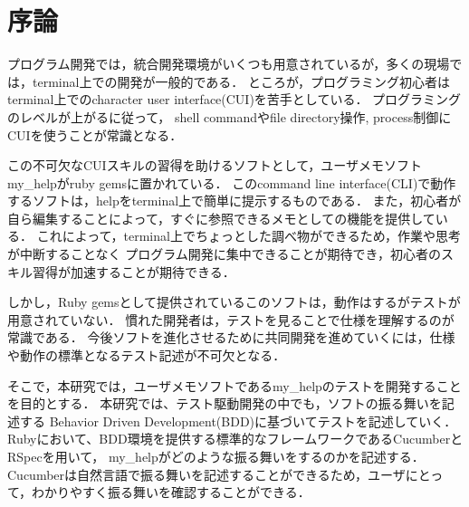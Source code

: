 \section{序論}
プログラム開発では，統合開発環境がいくつも用意されているが，多くの現場では，terminal上での開発が一般的である．
ところが，プログラミング初心者はterminal上でのcharacter user interface(CUI)を苦手としている．
プログラミングのレベルが上がるに従って，
shell commandやfile directory操作, process制御にCUIを使うことが常識となる．

この不可欠なCUIスキルの習得を助けるソフトとして，ユーザメモソフトmy\_helpがruby gemsに置かれている．
このcommand line interface(CLI)で動作するソフトは，helpをterminal上で簡単に提示するものである．
また，初心者が自ら編集することによって，すぐに参照できるメモとしての機能を提供している．
これによって，terminal上でちょっとした調べ物ができるため，作業や思考が中断することなく
プログラム開発に集中できることが期待でき，初心者のスキル習得が加速することが期待できる．

しかし，Ruby gemsとして提供されているこのソフトは，動作はするがテストが用意されていない．
慣れた開発者は，テストを見ることで仕様を理解するのが常識である．
今後ソフトを進化させるために共同開発を進めていくには，仕様や動作の標準となるテスト記述が不可欠となる．

そこで，本研究では，ユーザメモソフトであるmy\_helpのテストを開発することを目的とする．
本研究では、テスト駆動開発の中でも，ソフトの振る舞いを記述する
Behavior Driven Development(BDD)に基づいてテストを記述していく．
Rubyにおいて、BDD環境を提供する標準的なフレームワークであるCucumberとRSpecを用いて，
my\_helpがどのような振る舞いをするのかを記述する．
Cucumberは自然言語で振る舞いを記述することができるため，ユーザにとって，わかりやすく振る舞いを確認することができる．

